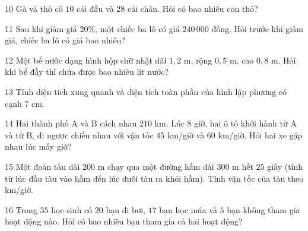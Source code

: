 \gap
\begin{probbox}{10}{\relax}
Gà và thỏ có $10$ cái đầu và $28$ cái chân. Hỏi có bao nhiêu con thỏ?
\end{probbox}
\begin{probbox}{11}{\relax}
Sau khi giảm giá $20\%$, một chiếc ba lô có giá $240\,000$ đồng. Hỏi trước khi giảm giá, chiếc ba lô có giá bao nhiêu?
\end{probbox}
\gap
\begin{probbox}{12}{\relax}
Một bể nước dạng hình hộp chữ nhật dài $1{,}2$ m, rộng $0{,}5$ m, cao $0{,}8$ m. Hỏi khi bể đầy thì chứa được bao nhiêu lít nước?
\end{probbox}
\gap
\begin{probbox}{13}{\relax}
Tính diện tích xung quanh và diện tích toàn phần của hình lập phương có cạnh $7$ cm.
\end{probbox}
\gap
\begin{probbox}{14}{\relax}
Hai thành phố A và B cách nhau $210$ km. Lúc $8$ giờ, hai ô tô khởi hành từ A và từ B, đi ngược chiều nhau với vận tốc $45$ km/giờ và $60$ km/giờ. Hỏi hai xe gặp nhau lúc mấy giờ?
\end{probbox}
\gap
\begin{probbox}{15}{\relax}
Một đoàn tàu dài $200$ m chạy qua một đường hầm dài $300$ m hết $25$ giây (tính từ lúc đầu tàu vào hầm đến lúc đuôi tàu ra khỏi hầm). Tính vận tốc của tàu theo km/giờ.
\end{probbox}
\gap
\begin{probbox}{16}{\relax}
Trong $35$ học sinh có $20$ bạn đi bơi, $17$ bạn học múa và $5$ bạn không tham gia hoạt động nào. Hỏi có bao nhiêu bạn tham gia cả hai hoạt động?
\end{probbox}
